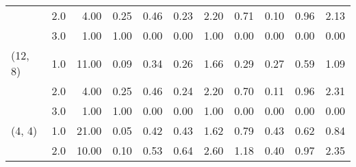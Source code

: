 \begin{tabular}{llrrrrrrrrr}
       & 2.0 &               4.00 &                     0.25 &                                 0.46 &                             0.23 &                           2.20 &                                               0.71 &                                            0.10 &                                            0.96 &                                        2.13 \\
       & 3.0 &               1.00 &                     1.00 &                                 0.00 &                             0.00 &                           1.00 &                                               0.00 &                                            0.00 &                                            0.00 &                                        0.00 \\
(12, 8) & 1.0 &              11.00 &                     0.09 &                                 0.34 &                             0.26 &                           1.66 &                                               0.29 &                                            0.27 &                                            0.59 &                                        1.09 \\
       & 2.0 &               4.00 &                     0.25 &                                 0.46 &                             0.24 &                           2.20 &                                               0.70 &                                            0.11 &                                            0.96 &                                        2.31 \\
       & 3.0 &               1.00 &                     1.00 &                                 0.00 &                             0.00 &                           1.00 &                                               0.00 &                                            0.00 &                                            0.00 &                                        0.00 \\
(4, 4) & 1.0 &              21.00 &                     0.05 &                                 0.42 &                             0.43 &                           1.62 &                                               0.79 &                                            0.43 &                                            0.62 &                                        0.84 \\
       & 2.0 &              10.00 &                     0.10 &                                 0.53 &                             0.64 &                           2.60 &                                               1.18 &                                            0.40 &                                            0.97 &                                        2.35 \\

\end{tabular}
